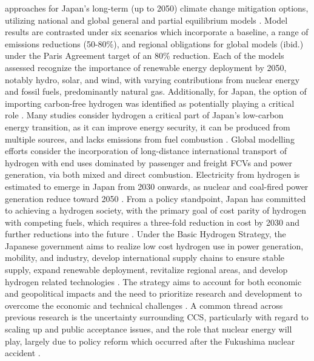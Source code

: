 approaches for Japan's long-term (up to 2050) climate change mitigation options, utilizing national and global general and partial equilibrium models \cite{sugiyama_japans_2019}. Model results are contrasted under six scenarios which incorporate a baseline, a range of emissions reductions (50-80\%), and regional obligations for global models (ibid.) under the Paris Agreement target of an 80\% reduction. Each of the models assessed recognize the importance of renewable energy deployment by 2050, notably hydro, solar, and wind, with varying contributions from nuclear energy and fossil fuels, predominantly natural gas. Additionally, for Japan, the option of importing carbon-free hydrogen was identified as potentially playing a critical role \cite{akimoto_estimates_2010, matsuo_global_2013, oshiro_diffusion_2015, oshiro_diffusion_2015, sugiyama_japans_2019}. Many studies consider hydrogen a critical part of Japan's low-carbon energy transition, as it can improve energy security, it can be produced from multiple sources, and lacks emissions from fuel combustion \cite{iida_hydrogen_2019}. Global modelling efforts consider the incorporation of long-distance international transport of hydrogen with end uses dominated by passenger and freight \glspl{FCV} and power generation, via both mixed and direct combustion. Electricity from hydrogen is estimated to emerge in Japan from 2030 onwards, as nuclear and coal-fired power generation reduce toward 2050 \cite{ishimoto_significance_2017}. From a policy standpoint, Japan has committed to achieving a hydrogen society, with the primary goal of cost parity of hydrogen with competing fuels, which requires a three-fold reduction in cost by 2030 and further reductions into the future \cite{nagashima_japans_2018}. Under the Basic Hydrogen Strategy, the Japanese government aims to realize low cost hydrogen use in power generation, mobility, and industry, develop international supply chains to ensure stable supply, expand renewable deployment, revitalize regional areas, and develop hydrogen related technologies \cite{noauthor_basic_2017}. The strategy aims to account for both economic and geopolitical impacts and the need to prioritize research and development to overcome the economic and technical challenges \cite{nagashima_japans_2018}. A common thread across previous research is the uncertainty surrounding \gls{CCS}, particularly with regard to scaling up and public acceptance issues, and the role that nuclear energy will play, largely due to policy reform which occurred after the Fukushima nuclear accident \cite{oshiro_mid-century_2019}.

